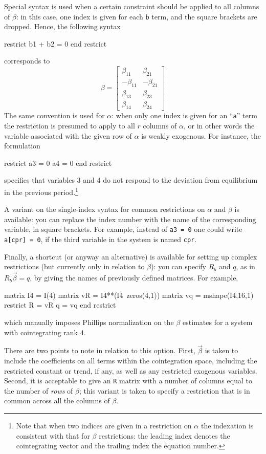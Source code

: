 Special syntax is used when a certain constraint should be applied to
all columns of $\beta$: in this case, one index is given for each
\texttt{b} term, and the square brackets are dropped.  Hence, the
following syntax
\begin{code}
restrict
  b1 + b2 = 0
end restrict
\end{code}
corresponds to
\[
\beta = \left[
\begin{array}{rr}
\beta_{11} & \beta_{21} \\
-\beta_{11} & -\beta_{21} \\
\beta_{13} & \beta_{23} \\
\beta_{14} & \beta_{24}
\end{array}
\right]
\]
The same convention is used for $\alpha$: when only one index is given
for an ``\texttt{a}'' term the restriction is presumed to apply to all
$r$ columns of $\alpha$, or in other words the variable associated
with the given row of $\alpha$ is weakly exogenous. For instance, the
formulation
%
\begin{code}
restrict
  a3 = 0
  a4 = 0
end restrict
\end{code}
%
specifies that variables 3 and 4 do not respond to the deviation from
equilibrium in the previous period.\footnote{Note that when two
  indices are given in a restriction on $\alpha$ the indexation is
  consistent with that for $\beta$ restrictions: the leading index
  denotes the cointegrating vector and the trailing index the equation
  number.} 

A variant on the single-index syntax for common restrictions on
$\alpha$ and $\beta$ is available: you can replace the index number
with the name of the corresponding variable, in square brackets. For
example, instead of \texttt{a3 = 0} one could write \texttt{a[cpr] =
  0}, if the third variable in the system is named \texttt{cpr}.

Finally, a shortcut (or anyway an alternative) is available for
setting up complex restrictions (but currently only in relation to
$\beta$): you can specify $R_b$ and $q$, as in $R_b \vec{\beta} = q$,
by giving the names of previously defined matrices.  For example,
%
\begin{code}
matrix I4 = I(4)
matrix vR = I4**(I4~zeros(4,1))
matrix vq = mshape(I4,16,1)
restrict
  R = vR
  q = vq
end restrict
\end{code}
%
which manually imposes Phillips normalization on the $\beta$ estimates
for a system with cointegrating rank 4. 

There are two points to note in relation to this option. First,
$\vec{\beta}$ is taken to include the coefficients on all terms within
the cointegration space, including the restricted constant or trend,
if any, as well as any restricted exogenous variables. Second, it is
acceptable to give an \texttt{R} matrix with a number of columns equal
to the number of \textit{rows} of $\beta$; this variant is taken to
specify a restriction that is in common across all the columns of
$\beta$.
 
